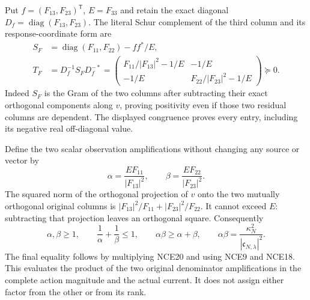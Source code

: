 \documentclass[11pt,a4paper]{article}
\begin{document}
Put $f=(F_{13},F_{23})^{\mathsf T}$, $E=F_{33}$ and retain the exact
diagonal $D_f=\operatorname{diag}(F_{13},F_{23})$. The literal Schur
complement of the third column and its response-coordinate form are
\[
 \begin{split}
 S_F&=\operatorname{diag}(F_{11},F_{22})-ff^*/E,\\
 T_F&=D_f^{-1}S_FD_f^{-*}
  =\begin{pmatrix}
   F_{11}/|F_{13}|^2-1/E&-1/E\\
   -1/E&F_{22}/|F_{23}|^2-1/E
   \end{pmatrix}\succeq0.
 \end{split}                                                     \tag{NCE19}
\]
Indeed $S_F$ is the Gram of the two columns after subtracting their
exact orthogonal components along $v$, proving positivity even if
those two residual columns are dependent. The displayed congruence
proves every entry, including its negative real off-diagonal value.

Define the two scalar observation amplifications without changing any
source or vector by
\[
 \alpha=\frac{E F_{11}}{|F_{13}|^2},\qquad
 \beta=\frac{E F_{22}}{|F_{23}|^2}.
 \tag{NCE20}
\]
The squared norm of the orthogonal projection of $v$ onto the two
mutually orthogonal original columns is
$|F_{13}|^2/F_{11}+|F_{23}|^2/F_{22}$. It cannot exceed $E$:
subtracting that projection leaves an orthogonal square. Consequently
\[
 \alpha,\beta\ge1,\qquad
 \frac1\alpha+\frac1\beta\le1,\qquad
 \alpha\beta\ge\alpha+\beta,
 \qquad
 \boxed{\alpha\beta=
       \frac{\kappa_N^2}{|\mathfrak c_{N,\lambda}|^2}.}
 \tag{NCE21}
\]
The final equality follows by multiplying NCE20 and using NCE9 and
NCE18. This evaluates the product of the two original denominator
amplifications in the complete action magnitude and the actual current.
It does not assign either factor from the other or from its rank.
\end{document}

